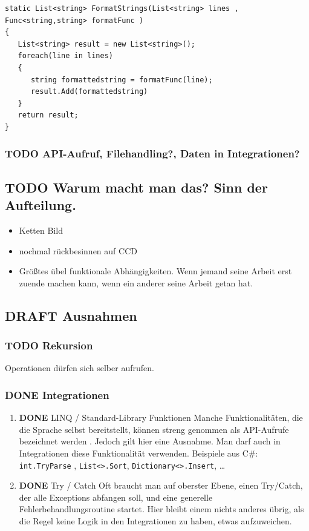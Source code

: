 \documentclass[11pt]{article}
\begin{document}
\begin{verbatim}
static List<string> FormatStrings(List<string> lines , Func<string,string> formatFunc )
{
   List<string> result = new List<string>();
   foreach(line in lines)
   {
      string formattedstring = formatFunc(line);
      result.Add(formattedstring) 
   }
   return result;
}
\end{verbatim}


\subsubsection{{\bfseries\sffamily TODO} API-Aufruf, Filehandling?, Daten in Integrationen?}
\label{sec:orgheadline53}
\subsection{{\bfseries\sffamily TODO} Warum macht man das? Sinn der Aufteilung.}
\label{sec:orgheadline55}
\begin{itemize}
\item Ketten Bild
\item nochmal rückbesinnen auf CCD
\item Größtes übel funktionale Abhängigkeiten. Wenn jemand seine Arbeit erst zuende machen kann, wenn ein anderer seine Arbeit getan hat.
\end{itemize}
\subsection{{\bfseries\sffamily DRAFT} Ausnahmen}
\label{sec:orgheadline60}
\subsubsection{{\bfseries\sffamily TODO} Rekursion}
\label{sec:orgheadline56}
Operationen dürfen sich selber aufrufen.
\subsubsection{{\bfseries\sffamily DONE} Integrationen}
\label{sec:orgheadline59}
\begin{enumerate}
\item {\bfseries\sffamily DONE} LINQ / Standard-Library Funktionen
\label{sec:orgheadline57}
Manche Funktionalitäten, die die Sprache selbst bereitstellt, können streng genommen als API-Aufrufe bezeichnet werden
. Jedoch gilt hier eine Ausnahme. Man darf auch in Integrationen diese Funktionalität verwenden.
Beispiele aus C\#:
\texttt{int.TryParse} , \texttt{List<>.Sort}, \texttt{Dictionary<>.Insert}, \ldots{}

\item {\bfseries\sffamily DONE} Try / Catch
\label{sec:orgheadline58}
Oft braucht man auf oberster Ebene, einen Try/Catch, der alle Exceptions abfangen soll, und eine generelle Fehlerbehandlungsroutine
startet. Hier bleibt einem nichts anderes übrig, als die Regel keine Logik in den Integrationen zu haben, etwas aufzuweichen.
\end{enumerate}
\end{document}
